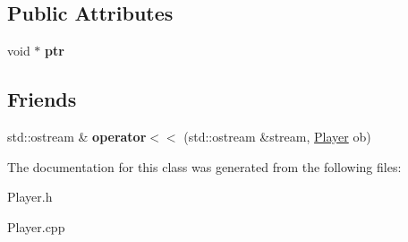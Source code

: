 \subsection*{\-Public \-Attributes}
\begin{DoxyCompactItemize}
\item 
\hypertarget{classPlayer_a76c2d795d6c4e4b3a3b2a9f69a2a1133}{void $\ast$ {\bfseries ptr}}\label{classPlayer_a76c2d795d6c4e4b3a3b2a9f69a2a1133}

\end{DoxyCompactItemize}
\subsection*{\-Friends}
\begin{DoxyCompactItemize}
\item 
\hypertarget{classPlayer_a15b9cd328a4513374ae79e1ed2576715}{std\-::ostream \& {\bfseries operator$<$$<$} (std\-::ostream \&stream, \hyperlink{classPlayer}{\-Player} ob)}\label{classPlayer_a15b9cd328a4513374ae79e1ed2576715}

\end{DoxyCompactItemize}


\-The documentation for this class was generated from the following files\-:\begin{DoxyCompactItemize}
\item 
\-Player.\-h\item 
\-Player.\-cpp\end{DoxyCompactItemize}
